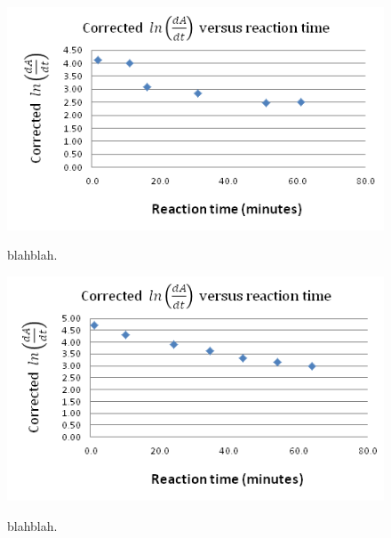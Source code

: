\begin{figure}[h]
  \includegraphics[scale=0.5]{./Figures/032M_dipic_readings.png}\\
  \caption{blahblah.}\label{fig:0.032M_dipic_readings}
\end{figure}

\begin{figure}[h]
  \includegraphics[scale=0.5]{./Figures/016M_dipic_readings.png}\\
  \caption{blahblah.}\label{fig:0.016M_dipic_readings}
\end{figure}
